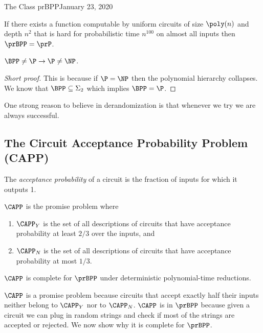 \begin{lecture}{1}{The Class prBPP}{January 23, 2020}
\begin{proposition}
	If there exists a function computable by uniform circuits of size $\poly(n)$ and depth $n^2$ that is hard for probabilistic time $n^{100}$ on almost all inputs then $\prBPP = \prP$.
\end{proposition}

\begin{proposition}
	$\BPP \neq \P \rightarrow \P \neq \NP$.
\end{proposition}
\begin{proof}[Short proof]
This is because if $\P = \NP$ then the polynomial hierarchy collapses. We know that $\BPP \subseteq \Sigma_2$ which implies $\BPP = \P$.
\end{proof}

One strong reason to believe in derandomization is that whenever we try we are always successful. 

\subsection{The Circuit Acceptance Probability Problem (CAPP)}

The \emph{acceptance probability} of a circuit is the fraction of inputs for
which it outputs 1.

\begin{definition}[$\CAPP$]
  $\CAPP$ is the promise problem where
  \begin{enumerate}
    \item $\CAPP_Y$ is the set of all descriptions of circuits that have
      acceptance probability at least $2/3$ over the inputs, and
    \item $\CAPP_N$ is the set of all descriptions of circuits that have
      acceptance probability at most $1/3$.
  \end{enumerate}
\end{definition}

\begin{theorem}\label{thm:complete}
  $\CAPP$ is complete for $\prBPP$ under deterministic polynomial-time reductions.
\end{theorem}

$\CAPP$ is a promise problem because circuits that accept exactly half their inputs neither belong to $\CAPP_Y$ nor to $\CAPP_N$. $\CAPP$ is in $\prBPP$ because given a circuit we can plug in random strings and check if most of the strings are accepted or rejected. We now show why it is complete for $\prBPP$.


\end{lecture}
